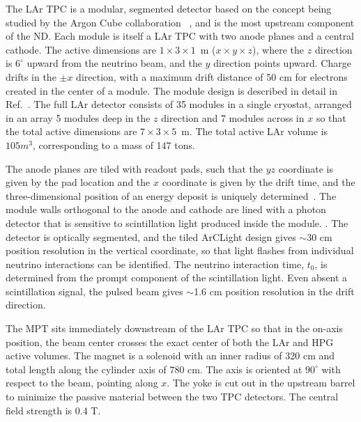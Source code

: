 The LAr TPC is a modular, segmented detector based on the concept being studied by the Argon Cube collaboration~\cite{ArgonCube} , and is the most upstream component of the ND. Each module is itself a LAr TPC with two anode planes and a central cathode. The active dimensions are $1 \times 3 \times 1$~m ($x \times y \times z$), where the $z$ direction is $6^{\circ}$ upward from the neutrino beam, and the $y$ direction points upward. Charge drifts in the $\pm x$ direction, with a maximum drift distance of 50 cm for electrons created in the center of a module. The module design is described in detail in Ref.~\cite{ArgonCube?}. The full LAr detector consists of 35 modules in a single cryostat, arranged in an array 5 modules deep in the $z$ direction and 7 modules across in $x$ so that the total active dimensions are $7 \times 3 \times 5$~m. The total active LAr volume is $105 m^{3}$, corresponding to a mass of 147 tons.

The anode planes are tiled with readout pads, such that the $yz$ coordinate is given by the pad location and the $x$ coordinate is given by the drift time, and the three-dimensional position of an energy deposit is uniquely determined~. The module walls orthogonal to the anode and cathode are lined with a photon detector that is sensitive to scintillation light produced inside the module. . The detector is optically segmented, and the tiled ArCLight design gives $\sim$30 cm position resolution in the vertical coordinate, so that light flashes from individual neutrino interactions can be identified. The neutrino interaction time, $t_{0}$, is determined from the prompt component of the scintillation light. Even absent a scintillation signal, the pulsed beam gives $\sim$1.6 cm position resolution in the drift direction.

The MPT sits immediately downstream of the LAr TPC so that in the on-axis position, the beam center crosses the exact center of both the LAr and HPG active volumes. The magnet is a solenoid with an inner radius of 320 cm and total length along the cylinder axis of 780 cm. The axis is oriented at $90^{\circ}$ with respect to the beam, pointing along $x$. The yoke is cut out in the upstream barrel to minimize the passive material between the two TPC detectors. The central field strength is 0.4 T.

